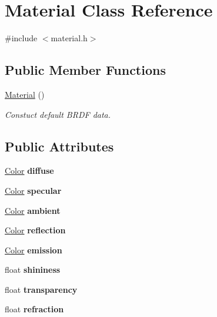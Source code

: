\hypertarget{class_material}{}\section{Material Class Reference}
\label{class_material}


{\ttfamily \#include $<$material.\+h$>$}

\subsection*{Public Member Functions}
\begin{DoxyCompactItemize}
\item 
\mbox{\label{class_material_a137e987401b63eb7c6c27c3e38bc74b5}} 
\mbox{\hyperlink{class_material_a137e987401b63eb7c6c27c3e38bc74b5}{Material}} ()
\begin{DoxyCompactList}\small\item\em Constuct default B\+R\+DF data. \end{DoxyCompactList}\end{DoxyCompactItemize}
\subsection*{Public Attributes}
\begin{DoxyCompactItemize}
\item 
\mbox{\label{class_material_aa7b50861655dd42ca5336f5eac2211b9}} 
\mbox{\hyperlink{class_color}{Color}} {\bfseries diffuse}
\item 
\mbox{\label{class_material_ae8fe63cefbd055a095c914ca50f925aa}} 
\mbox{\hyperlink{class_color}{Color}} {\bfseries specular}
\item 
\mbox{\label{class_material_a5925c60fcc13940f3a04d168c7c89bc3}} 
\mbox{\hyperlink{class_color}{Color}} {\bfseries ambient}
\item 
\mbox{\label{class_material_a2e9069415c0c068c438aa9316e6a8301}} 
\mbox{\hyperlink{class_color}{Color}} {\bfseries reflection}
\item 
\mbox{\label{class_material_a65ace9c668a71f20b7f5ba4649a3ec82}} 
\mbox{\hyperlink{class_color}{Color}} {\bfseries emission}
\item 
\mbox{\label{class_material_a9dc184c883ec135ace28c1917af3fe84}} 
float {\bfseries shininess}
\item 
\mbox{\label{class_material_a1110edc78893dc31204bfc50ef9b5704}} 
float {\bfseries transparency}
\item 
\mbox{\label{class_material_aaebf2300e8593a5b62c65f392313542c}} 
float {\bfseries refraction}
\end{DoxyCompactItemize}


